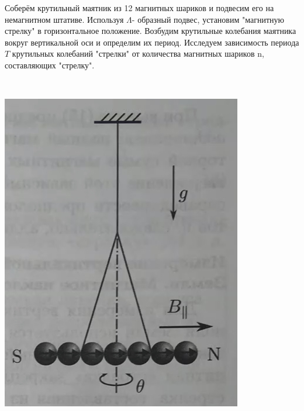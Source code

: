 \documentclass[a4paper,12pt]{article}
\begin{document}
\begin{minipage}{0.45\textwidth}
Соберём крутильный маятник из 12 магнитных шариков и подвесим его на немагнитном штативе. Используя $\Lambda$- образный подвес, установим "магнитную стрелку" в горизонтальное положение.
Возбудим крутильные колебания маятника вокруг вертикальной оси и определим их период. Исследуем зависимость периода $T$ крутильных колебаний "стрелки" от количества магнитных шариков n, составляющих "стрелку".
\end{minipage}
\begin{minipage}{0.1\textwidth}
\
\end{minipage}
\begin{minipage}{0.45\textwidth}
\begin{center}
\includegraphics[width=0.7\linewidth]{3.jpg}\\
\end{center}
\end{minipage}
\end{document}
